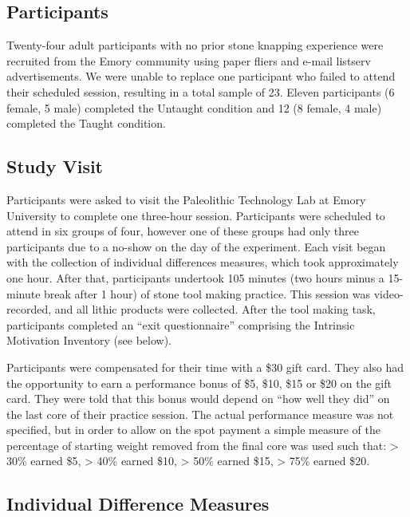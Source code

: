 \documentclass[smallextended]{svjour3}       %
\begin{document}
\hypertarget{participants}{%
\subsection{\texorpdfstring{\textbf{Participants}}{Participants}}\label{participants}}

Twenty-four adult participants with no prior stone knapping experience
were recruited from the Emory community using paper fliers and e-mail
listserv advertisements. We were unable to replace one participant who
failed to attend their scheduled session, resulting in a total sample of
23. Eleven participants (6 female, 5 male) completed the Untaught
condition and 12 (8 female, 4 male) completed the Taught condition.

\hypertarget{study-visit}{%
\subsection{\texorpdfstring{\textbf{Study
Visit}}{Study Visit}}\label{study-visit}}

Participants were asked to visit the Paleolithic Technology Lab at Emory
University to complete one three-hour session. Participants were
scheduled to attend in six groups of four, however one of these groups
had only three participants due to a no-show on the day of the
experiment. Each visit began with the collection of individual
differences measures, which took approximately one hour. After that,
participants undertook 105 minutes (two hours minus a 15-minute break
after 1 hour) of stone tool making practice. This session was
video-recorded, and all lithic products were collected. After the tool
making task, participants completed an ``exit questionnaire'' comprising
the Intrinsic Motivation Inventory (see below).

Participants were compensated for their time with a \$30 gift card. They
also had the opportunity to earn a performance bonus of \$5, \$10, \$15
or \$20 on the gift card. They were told that this bonus would depend on
``how well they did'' on the last core of their practice session. The
actual performance measure was not specified, but in order to allow on
the spot payment a simple measure of the percentage of starting weight
removed from the final core was used such that: \textgreater{} 30\%
earned \$5, \textgreater{} 40\% earned \$10, \textgreater{} 50\% earned
\$15, \textgreater{} 75\% earned \$20.

\hfill\break

\hypertarget{individual-difference-measures}{%
\subsection{\texorpdfstring{\textbf{Individual Difference
Measures}}{Individual Difference Measures}}\label{individual-difference-measures}}
\end{document}
